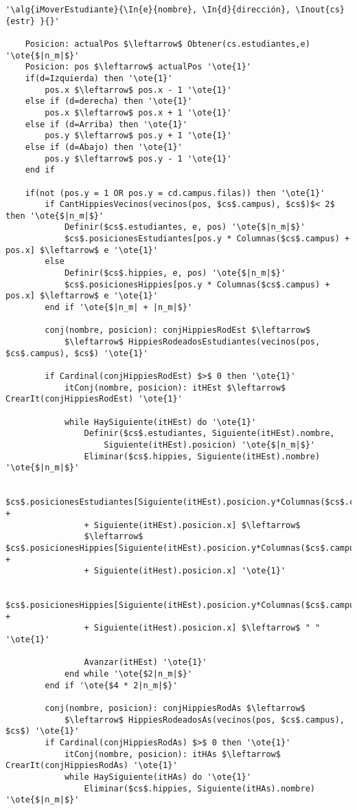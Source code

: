 \begin{lstlisting}[mathescape]
'\alg{iMoverEstudiante}{\In{e}{nombre}, \In{d}{dirección}, \Inout{cs}{estr} }{}'
	
	Posicion: actualPos $\leftarrow$ Obtener(cs.estudiantes,e) '\ote{$|n_m|$}'
	Posicion: pos $\leftarrow$ actualPos '\ote{1}'
	if(d=Izquierda) then '\ote{1}'
		pos.x $\leftarrow$ pos.x - 1 '\ote{1}'
	else if (d=derecha) then '\ote{1}'
		pos.x $\leftarrow$ pos.x + 1 '\ote{1}'
	else if (d=Arriba) then '\ote{1}'
		pos.y $\leftarrow$ pos.y + 1 '\ote{1}'
 	else if (d=Abajo) then '\ote{1}'
 		pos.y $\leftarrow$ pos.y - 1 '\ote{1}'
 	end if

 	if(not (pos.y = 1 OR pos.y = cd.campus.filas)) then '\ote{1}'
		if CantHippiesVecinos(vecinos(pos, $cs$.campus), $cs$)$< 2$  then '\ote{$|n_m|$}'
			Definir($cs$.estudiantes, e, pos) '\ote{$|n_m|$}'
			$cs$.posicionesEstudiantes[pos.y * Columnas($cs$.campus) + pos.x] $\leftarrow$ e '\ote{1}'
		else
			Definir($cs$.hippies, e, pos) '\ote{$|n_m|$}'
			$cs$.posicionesHippies[pos.y * Columnas($cs$.campus) + pos.x] $\leftarrow$ e '\ote{1}'
		end if '\ote{$|n_m| + |n_m|$}'
		
		conj(nombre, posicion): conjHippiesRodEst $\leftarrow$ 
			$\leftarrow$ HippiesRodeadosEstudiantes(vecinos(pos, $cs$.campus), $cs$) '\ote{1}'

		if Cardinal(conjHippiesRodEst) $>$ 0 then '\ote{1}'
			itConj(nombre, posicion): itHEst $\leftarrow$ CrearIt(conjHippiesRodEst) '\ote{1}'
			
			while HaySiguiente(itHEst) do '\ote{1}'
				Definir($cs$.estudiantes, Siguiente(itHEst).nombre, 
					Siguiente(itHEst).posicion) '\ote{$|n_m|$}'
				Eliminar($cs$.hippies, Siguiente(itHEst).nombre) '\ote{$|n_m|$}'
				
				$cs$.posicionesEstudiantes[Siguiente(itHEst).posicion.y*Columnas($cs$.campus) + 
				+ Siguiente(itHEst).posicion.x] $\leftarrow$ 
				$\leftarrow$ $cs$.posicionesHippies[Siguiente(itHEst).posicion.y*Columnas($cs$.campus) + 
				+ Siguiente(itHest).posicion.x] '\ote{1}'
				
				$cs$.posicionesHippies[Siguiente(itHEst).posicion.y*Columnas($cs$.campus) + 
				+ Siguiente(itHest).posicion.x] $\leftarrow$ " " '\ote{1}'
				
				Avanzar(itHEst) '\ote{1}'
			end while '\ote{$2|n_m|$}'
		end if '\ote{$4 * 2|n_m|$}'

		conj(nombre, posicion): conjHippiesRodAs $\leftarrow$
			$\leftarrow$ HippiesRodeadosAs(vecinos(pos, $cs$.campus), $cs$) '\ote{1}'
		if Cardinal(conjHippiesRodAs) $>$ 0 then '\ote{1}'
			itConj(nombre, posicion): itHAs $\leftarrow$ CrearIt(conjHippiesRodAs) '\ote{1}'	
			while HaySiguiente(itHAs) do '\ote{1}'
				Eliminar($cs$.hippies, Siguiente(itHAs).nombre) '\ote{$|n_m|$}'
				

\end{lstlisting}
